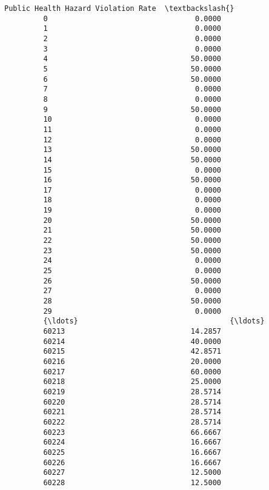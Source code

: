 \documentclass[11pt]{article}
\begin{document}
\begin{Verbatim}[commandchars=\\\{\}]
               Public Health Hazard Violation Rate  \textbackslash{}
         0                                  0.0000   
         1                                  0.0000   
         2                                  0.0000   
         3                                  0.0000   
         4                                 50.0000   
         5                                 50.0000   
         6                                 50.0000   
         7                                  0.0000   
         8                                  0.0000   
         9                                 50.0000   
         10                                 0.0000   
         11                                 0.0000   
         12                                 0.0000   
         13                                50.0000   
         14                                50.0000   
         15                                 0.0000   
         16                                50.0000   
         17                                 0.0000   
         18                                 0.0000   
         19                                 0.0000   
         20                                50.0000   
         21                                50.0000   
         22                                50.0000   
         23                                50.0000   
         24                                 0.0000   
         25                                 0.0000   
         26                                50.0000   
         27                                 0.0000   
         28                                50.0000   
         29                                 0.0000   
         {\ldots}                                   {\ldots}   
         60213                             14.2857   
         60214                             40.0000   
         60215                             42.8571   
         60216                             20.0000   
         60217                             60.0000   
         60218                             25.0000   
         60219                             28.5714   
         60220                             28.5714   
         60221                             28.5714   
         60222                             28.5714   
         60223                             66.6667   
         60224                             16.6667   
         60225                             16.6667   
         60226                             16.6667   
         60227                             12.5000   
         60228                             12.5000   

\end{Verbatim}
\end{document}
